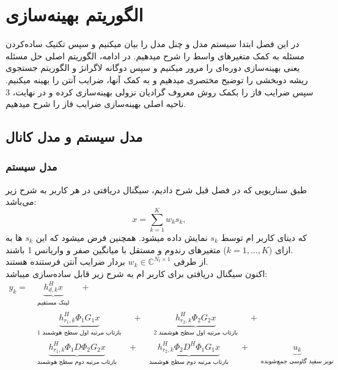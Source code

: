 \chapter{الگوریتم بهینه‌سازی}
در این فصل ابتدا سیستم مدل و چنل مدل را بیان میکنیم و سپس تکنیک ساده‌کردن مسئله به کمک متغیرهای واسط را شرح میدهیم. در ادامه، الگوریتم اصلی حل مسئله یعنی بهینه‌سازی دوره‌ای را مرور میکنیم و سپس دوگانه لاگرانژ و الگوریتم جستجوی ریشه دوبخشی را توضیح مختصری میدهیم و به کمک آنها، ضرایب آنتن را بهینه میکنیم. سپس ضرایب فاز را بکمک روش معروف گرادیان نزولی بهینه‌سازی کرده و در نهایت، 3 ناحیه اصلی بهینه‌سازی ضرایب فاز را شرح میدهیم. 
\newpage
\section{
	مدل سیستم و مدل کانال
}

\subsection{مدل سیستم}
طبق سناریویی که در فصل قبل شرح دادیم، سیگنال دریافتی در هر کاربر به شرح زیر می‌باشد:
\begin{equation}
	x = \sum_{k=1}^{K} w_k s_k, \label{eq:transmitted_signal}
\end{equation}
که دیتای کاربر  ام توسط $s_k$ نمایش داده میشود. همچنین فرض میشود که این $s_k$ ها به ازای ($k = 1, \ldots, K$) متغیرهای رندوم و مستقل با میانگین صفر و واریانس 1 باشند.\\
از طرفی $w_k \in \mathbb{C}^{N_t \times 1}$ بردار ضرایب آنتن فرستنده هستند.\\
اکنون سیگنال دریافتی برای کاربر  ام به شرح زیر قابل ساده‌سازی میباشد:
\begin{align*}
	y_k = &\underbrace{h_{d,k}^H x}_
	{\substack{\text{لینک مستقیم}}}
	\quad + \quad \\
	&\underbrace{h_{r_1,k}^H \Phi_1 G_1 x}_
	{\substack{\text{بازتاب مرتبه اول سطح هوشمند 1}}}
	\quad + \quad
	\underbrace{h_{r_2,k}^H \Phi_2 G_2 x}_
	{\substack{\text{بازتاب مرتبه اول سطح هوشمند 2}}}
	\quad + \quad \\ 
	&\underbrace{h_{r_1,k}^H \Phi_1 D \Phi_2 G_2 x}_
	{\substack{\text{بازتاب مرتبه دوم سطح هوشمند}}}
	\quad + \quad
	\underbrace{h_{r_2,k}^H \Phi_2 D^H \Phi_1 G_1 x}_
	{\substack{\text{بازتاب مرتبه دوم سطح هوشمند}}} \quad + \quad
	\underbrace{u_k}_
	{\substack{\text{نویز سفید گاوسی جمع‌شونده}}}
\end{align*}

